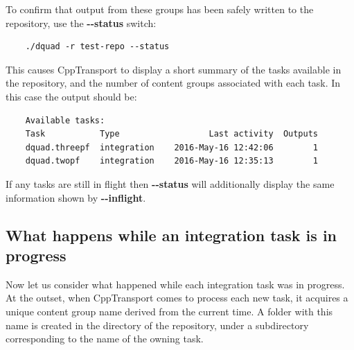 \documentclass[11pt,a4paper]{article}
\renewcommand{\texttt}[1]{{\ttfamily\fontseries{l}\selectfont{#1}}}
\newcommand{\packagefont}{\sffamily}
\newcommand{\CppTransport}{{\packagefont CppTransport}}
\newcommand{\file}[1]{\texttt{{#1}}}
\newcommand{\option}[1]{{\ttfamily\bfseries\small #1}}
\begin{document}
To confirm that output from these groups has been safely written to the repository,
use the \option{{-}{-}status} switch:
\begin{verbatim}
    ./dquad -r test-repo --status    
\end{verbatim}
This causes {\CppTransport} to display a short summary of the tasks available
in the repository, and the number of content groups associated with each task.
In this case the output should be:
\begin{verbatim}
    Available tasks:
    Task           Type                  Last activity  Outputs
    dquad.threepf  integration    2016-May-16 12:42:06        1
    dquad.twopf    integration    2016-May-16 12:35:13        1
\end{verbatim}
If any tasks are still in flight then \option{{-}{-}status} will
additionally display the
same information shown by \option{{-}{-}inflight}.

\subsection{What happens while an integration task is in progress}
\label{sec:what-happens}
Now let us consider what happened while each integration task was in progress.
At the outset, when {\CppTransport} comes to process each new task,
it acquires a unique content group name derived from the current time.
A folder with this name is created in the
\file{output} directory of the repository, under a subdirectory
corresponding to the name of the owning task.
\end{document}
